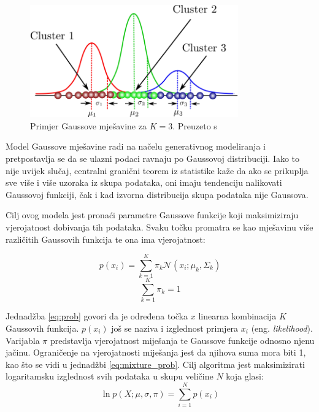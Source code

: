 \documentclass[utf8, diplomski, numeric]{fer}
\begin{document}
\begin{figure}[htb]
\includegraphics[width=0.8\textwidth]{images/gauss_mixture.png}
\centering
\caption{Primjer Gaussove mješavine za $K = 3$. Preuzeto s  \cite{GaussianMixtureExplained}}
\label{fig:gauss-mixture}
\end{figure}

Model Gaussove mješavine radi na načelu generativnog modeliranja i pretpostavlja se da se ulazni podaci ravnaju po Gaussovoj distribuciji. Iako to nije uvijek slučaj, centralni granični teorem iz statistike kaže da ako se prikuplja sve više i više uzoraka iz skupa podataka, oni imaju tendenciju nalikovati Gaussovoj funkciji, čak i kad izvorna distribucija skupa podataka nije Gaussova.

Cilj ovog modela jest pronaći parametre Gaussove funkcije koji maksimiziraju vjerojatnost dobivanja tih podataka. Svaku točku promatra se kao mješavinu više različitih Gaussovih funkcija te ona ima vjerojatnost:

\begin{equation}\label{eq:prob}
p(x_i) = \sum_{k=1}^{K}\pi_k \mathcal{N}(x_i;\mu_k,\Sigma_k)
\end{equation}
\begin{equation}\label{eq:mixture_prob}
\sum_{k=1}^{K}\pi_k  = 1
\end{equation}

Jednadžba \ref{eq:prob} govori da je određena točka $x$ linearna kombinacija $K$ Gaussovih funkcija. $p(x_i)$ još se naziva i izglednost primjera $x_i$ (eng. \textit{likelihood}). Varijabla $\pi$ predstavlja vjerojatnost miješanja te Gaussove funkcije odnosno njenu jačinu. Ograničenje na vjerojatnosti miješanja jest da njihova suma mora biti 1, kao što se vidi u jednadžbi \ref{eq:mixture_prob}. Cilj algoritma jest maksimizirati logaritamsku izglednost svih podataka u skupu veličine $N$ koja glasi:
\begin{equation}\label{eg:likelihood}
\ln p(X; \mu, \sigma, \pi) = \sum_{i=1}^{N} p(x_i)
 \end{equation}
\end{document}
